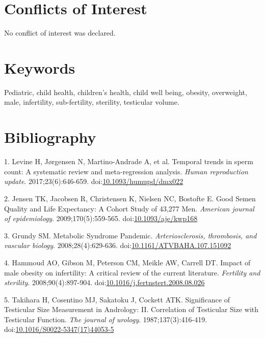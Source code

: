 \documentclass[11pt]{article}
\begin{document}
\section{Conflicts of Interest}
\label{sec:org9f14951}
No conflict of interest was declared.

\section{Keywords}
\label{sec:org6bc8cb2}
Pediatric, child health, children's health, child well being,
obesity, overweight,
male,
infertility, sub-fertility, sterility,
testicular volume.

\section{Bibliography}
\label{sec:org04f8734}
\hypertarget{citeproc_bib_item_1}{1. Levine H, Jørgensen N, Martino-Andrade A, et al. Temporal trends in sperm count: A systematic review and meta-regression analysis. \textit{Human reproduction update}. 2017;23(6):646-659. doi:\href{https://doi.org/10.1093/humupd/dmx022}{10.1093/humupd/dmx022}}

\hypertarget{citeproc_bib_item_2}{2. Jensen TK, Jacobsen R, Christensen K, Nielsen NC, Bostofte E. Good Semen Quality and Life Expectancy: A Cohort Study of 43,277 Men. \textit{American journal of epidemiology}. 2009;170(5):559-565. doi:\href{https://doi.org/10.1093/aje/kwp168}{10.1093/aje/kwp168}}

\hypertarget{citeproc_bib_item_3}{3. Grundy SM. Metabolic Syndrome Pandemic. \textit{Arteriosclerosis, thrombosis, and vascular biology}. 2008;28(4):629-636. doi:\href{https://doi.org/10.1161/ATVBAHA.107.151092}{10.1161/ATVBAHA.107.151092}}

\hypertarget{citeproc_bib_item_4}{4. Hammoud AO, Gibson M, Peterson CM, Meikle AW, Carrell DT. Impact of male obesity on infertility: A critical review of the current literature. \textit{Fertility and sterility}. 2008;90(4):897-904. doi:\href{https://doi.org/10.1016/j.fertnstert.2008.08.026}{10.1016/j.fertnstert.2008.08.026}}

\hypertarget{citeproc_bib_item_5}{5. Takihara H, Cosentino MJ, Sakatoku J, Cockett ATK. Significance of Testicular Size Measurement in Andrology: II. Correlation of Testicular Size with Testicular Function. \textit{The journal of urology}. 1987;137(3):416-419. doi:\href{https://doi.org/10.1016/S0022-5347(17)44053-5}{10.1016/S0022-5347(17)44053-5}}
\end{document}

